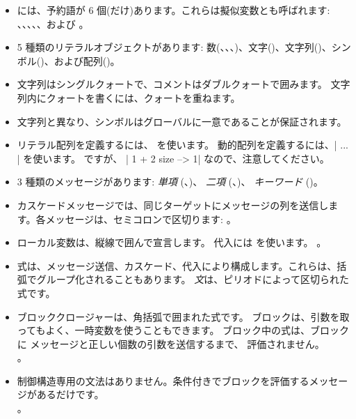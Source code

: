 \documentclass[a4paper,10pt,twoside]{book}
\begin{document}
\begin{itemize}

\item	\pharo には、予約語が 6 個(だけ)あります。これらは擬似変数とも呼ばれます: 、、、、、および 。

\item	5 種類のリテラルオブジェクトがあります: 数(、、、)、文字()、文字列()、シンボル()、および配列()。

\item	文字列はシングルクォートで、コメントはダブルクォートで囲みます。
		文字列内にクォートを書くには、クォートを重ねます。

\item	文字列と異なり、シンボルはグローバルに一意であることが保証されます。

\item	リテラル配列を定義するには、 を使います。
		動的配列を定義するには、\ct|{ ... }| を使います。
		 ですが、
		\ct|{ 1 + 2 } size --> 1|
		なので、注意してください。

\item	3 種類のメッセージがあります:
		\emph{単項} (\eg {}、)、
		\emph{二項} (\eg {}、)、
		\emph{キーワード} (\eg {})。

\item	カスケードメッセージでは、同じターゲットにメッセージの列を送信します。各メッセージは、セミコロンで区切ります:
。

\item	ローカル変数は、縦線で囲んで宣言します。
		代入には \ct{:=} を使います。
		。

\item	式は、メッセージ送信、カスケード、代入により構成します。これらは、括弧でグループ化されることもあります。
		\emph{文}は、ピリオドによって区切られた式です。

\item	ブロッククロージャーは、角括弧で囲まれた式です。
		ブロックは、引数を取ってもよく、一時変数を使うこともできます。
		ブロック中の式は、ブロックに  メッセージと正しい個数の引数を送信するまで、
		評価されません。\\
		。

\item	制御構造専用の文法はありません。条件付きでブロックを評価するメッセージがあるだけです。\\
 		。

\end{itemize}

\ifx\wholebook\relax\else
\end{document}
